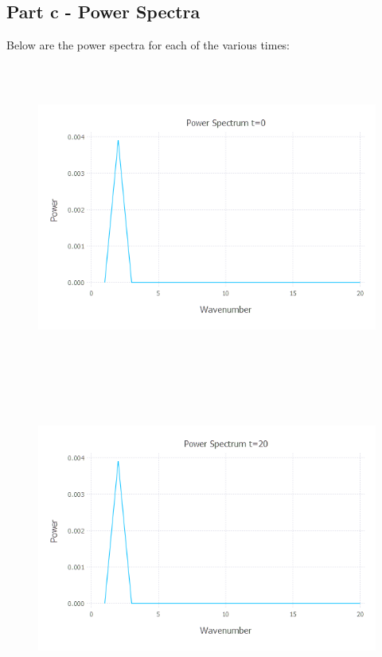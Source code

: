 \documentclass{article}
\begin{document}
\subsection{Part c - Power Spectra}
Below are the power spectra for each of the various times:
\begin{figure}[H]
	\includegraphics[width=6in,height=4in]{"q4_ps_0"}
\end{figure}
\begin{figure}[H]
	\includegraphics[width=6in,height=4in]{"q4_ps_20"}
\end{figure}
\end{document}
